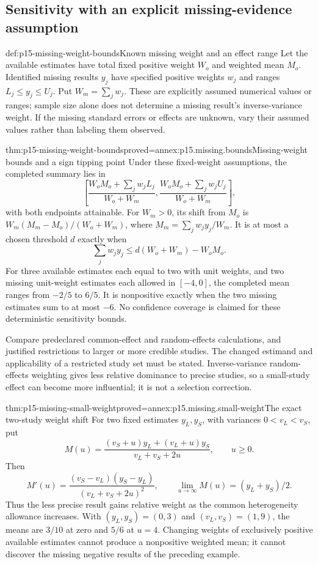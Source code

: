 \subsection{Sensitivity with an explicit missing-evidence assumption}

\begin{hbdefinition}{def:p15-missing-weight-bounds}{Known missing weight and an effect range}
Let the available estimates have total fixed positive weight \(W_o\)
and weighted mean \(M_o\). Identified missing results \(y_j\)
have specified positive weights \(w_j\) and ranges
\(L_j\leq y_j\leq U_j\). Put \(W_m=\sum_jw_j\).
These are explicitly assumed numerical values or ranges; sample size
alone does not determine a missing result's inverse-variance weight.
If the missing standard errors or effects are unknown, vary their
assumed values rather than labeling them observed.
\end{hbdefinition}

\begin{hbtheorem}{thm:p15-missing-weight-bounds}{proved=annex:p15.missing.bounds}{Missing-weight bounds and a sign tipping point}
Under these fixed-weight assumptions, the completed summary lies in
\[
 \left[\frac{W_oM_o+\sum_jw_jL_j}{W_o+W_m},
       \frac{W_oM_o+\sum_jw_jU_j}{W_o+W_m}\right],
\]
with both endpoints attainable. For \(W_m>0\), its shift from
\(M_o\) is \(W_m(M_m-M_o)/(W_o+W_m)\), where
\(M_m=\sum_jw_jy_j/W_m\).
It is at most a chosen threshold \(d\) exactly when
\[
                 \sum_jw_jy_j\leq d(W_o+W_m)-W_oM_o.
\]
For three available estimates each equal to two with unit weights,
and two missing unit-weight estimates each allowed in \([-4,0]\),
the completed mean ranges from \(-2/5\) to \(6/5\).
It is nonpositive exactly when the two missing estimates sum to
at most \(-6\). No confidence coverage is claimed for these
deterministic sensitivity bounds.
\end{hbtheorem}

Compare predeclared common-effect and random-effects calculations,
and justified restrictions to larger or more credible studies.
The changed estimand and applicability of a restricted study set
must be stated. Inverse-variance random-effects weighting gives
less relative dominance to precise studies, so a small-study effect
can become more influential; it is not a selection correction.

\begin{hbtheorem}{thm:p15-missing-small-weight}{proved=annex:p15.missing.small-weight}{The exact two-study weight shift}
For two fixed estimates \(y_L,y_S\), with variances
\(0<v_L<v_S\), put
\[
 M(u)=\frac{(v_S+u)y_L+(v_L+u)y_S}{v_L+v_S+2u},
                         \qquad u\geq0.
\]
Then
\[
 M'(u)=\frac{(v_S-v_L)(y_S-y_L)}{(v_L+v_S+2u)^2},\qquad
 \lim_{u\to\infty}M(u)=(y_L+y_S)/2.
\]
Thus the less precise result gains relative weight as the common
heterogeneity allowance increases. With \((y_L,y_S)=(0,3)\)
and \((v_L,v_S)=(1,9)\), the means are \(3/10\) at zero
and \(5/6\) at \(u=4\). Changing weights of exclusively
positive available estimates cannot produce a nonpositive weighted
mean; it cannot discover the missing negative results of the preceding
example.
\end{hbtheorem}

